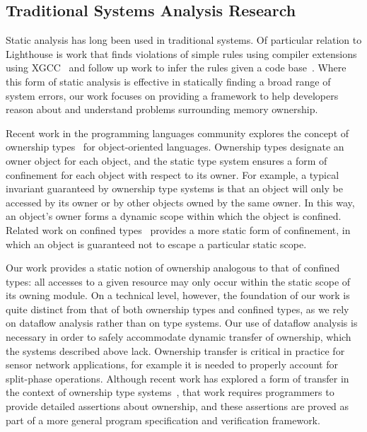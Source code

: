 \subsection{Traditional Systems Analysis Research}



Static analysis has long been used in traditional systems.
%
Of particular relation to Lighthouse is work that finds violations of simple
rules using compiler extensions using XGCC~\cite{engler00programmer} and
follow up work to infer the rules given a code base~\cite{kremenek06from}.
%
Where this form of static analysis is effective in statically finding a broad
range of system errors, our work focuses on providing a framework to help
developers reason about and understand problems surrounding memory
ownership.
%



Recent work in the programming languages community explores the concept of
ownership types~\cite{ownership,ownership2,BoyapatiEtAl02,aliasjava} for
object-oriented languages. 
%
Ownership types designate an owner object for each object, and the static
type system ensures a form of confinement for each object with respect to
its owner.  
%
For example, a typical invariant guaranteed by ownership type systems is
that an object will only be accessed by its owner or by other objects owned
by the same owner.  
%
In this way, an object's owner forms a dynamic scope within which the object
is confined.  
%
Related work on confined types~\cite{confined1,confined2} provides a more
static form of confinement, in which an object is guaranteed not to escape a
particular static scope.



Our work provides a static notion of ownership analogous to that of confined
types:  all accesses to a given resource may only occur within the static
scope of its owning module.  
%
On a technical level, however, the foundation of our work is quite distinct
from that of both ownership types and confined types, as we rely on dataflow
analysis rather than on type systems.  
%
Our use of dataflow analysis is necessary in order to safely accommodate
dynamic transfer of ownership, which the systems described above lack.  
%
Ownership transfer is critical in practice for sensor network applications,
for example it is needed to properly account for split-phase operations.  
%
Although recent work has explored a form of transfer in the context of
ownership type systems~\cite{DBLP:conf/ecoop/BanerjeeN05}, that work
requires programmers to provide detailed assertions about ownership, and
these assertions are proved as part of a more general program specification
and verification framework.



